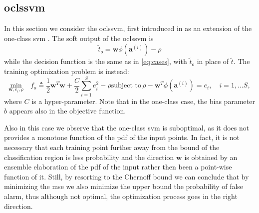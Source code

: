 \documentclass[draftcls,onecolumn,12pt]{IEEEtran}
\begin{document}
\subsection{\Acl{oclssvm}}
In this section we consider the \ac{oclssvm}, first introduced in \cite{choi2009least} as an extension of the one-class \ac{svm} \cite{Scholkopf2001estimating}. The soft output of the \ac{oclssvm} is 
\begin{equation}
	\tilde{t}_o = \mathbf{w} \phi(\mathbf{a}^{(i)}) - \rho		
\end{equation} 
while the decision function is the same as in \eqref{eq:cases}, with $\tilde{t}_o$ in place of $\tilde{t}$. The training optimization problem is instead:
\begin{subequations}
	\label{eq:oneClassSvm}
	\begin{equation}
	\label{eq:oneClass1}
	\underset{\mathbf{w},e_i, \rho}{\text{min}} \quad f_o \triangleq
	 \frac{1}{2} \mathbf{w}^T \mathbf{w} +  \frac{C}{2} \sum_{i=1}^S e_i^2 - \rho 
	\end{equation}
	\begin{equation}
	\label{eq:oneClassConstr}
	\text{subject to}\, \rho - \mathbf{w}^T \phi (\mathbf{a}^{(i)})  = e_i,  \quad i = 1,\dots S, 
	\end{equation}
\end{subequations}
where $C$ is a hyper-parameter.
Note that in the one-class case, the bias parameter $b$ appears also in the objective function.


Also in this case we observe that the one-class \ac{svm} is suboptimal, as it does not provides a monotone function of the \ac{pdf} of the input points. In fact, it is not necessary that each training point further away from the bound of the classification region is less probability and the direction $\bm{w}$ is obtained by an ensemble elaboration of the \ac{pdf} of the input rather then been a point-wise function of it. Still, by resorting to the Chernoff bound we can conclude that by minimizing the \ac{mse} we also minimize the upper bound the probability of false alarm, thus although not optimal, the optimization process goes in the right direction.
\end{document}
